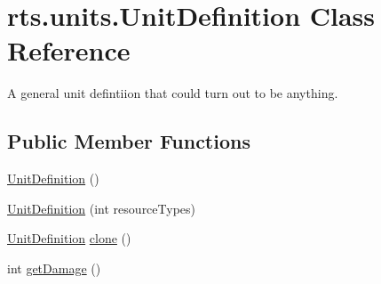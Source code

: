 \hypertarget{classrts_1_1units_1_1_unit_definition}{
\section{rts.units.UnitDefinition Class Reference}
\label{classrts_1_1units_1_1_unit_definition}
}


A general unit defintiion that could turn out to be anything.  


\subsection*{Public Member Functions}
\begin{DoxyCompactItemize}
\item 
\hyperlink{classrts_1_1units_1_1_unit_definition_af7559fcd7f1a6c67ca44120cdb58e4ad}{UnitDefinition} ()
\item 
\hyperlink{classrts_1_1units_1_1_unit_definition_ac3cb15d9b730d04c764985b27b75aaa7}{UnitDefinition} (int resourceTypes)
\item 
\hyperlink{classrts_1_1units_1_1_unit_definition}{UnitDefinition} \hyperlink{classrts_1_1units_1_1_unit_definition_a4abeb613a32c316d59bfb53598adb8c2}{clone} ()
\item 
int \hyperlink{classrts_1_1units_1_1_unit_definition_a5e9e7594b9c96ee78eba7594fdd5c7e0}{getDamage} ()
\end{DoxyCompactItemize}
